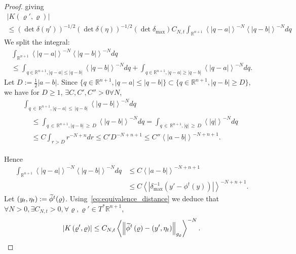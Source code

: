 \documentclass[10pt]{amsart}
\theoremstyle{definition}\newtheorem{defi}[theo]{Definition}\newtheorem{rema}[theo]{Remark}\newtheorem{exam}[theo]{Example}\newtheorem{exem}[theo]{Example}\newtheorem{nota}[theo]{Notation}
\newcommand{\bbR}{\mathbb{R}}
\let\oldtilde\tilde
\renewcommand*{\tilde}[1]{\mathchoice{\widetilde{#1}}{\widetilde{#1}}{\oldtilde{#1}}{\oldtilde{#1}}}
\let\oldexists\exists
\renewcommand*{\exists}{\mathrel{\oldexists}}
\let\oldforall\forall
\renewcommand*{\forall}{\mathrel{\oldforall}}
\begin{document}
\begin{proof}
giving
\begin{multline*}
\left|K\left(\varrho',\varrho\right)\right|\\\leq\left(\det \delta\left(\eta'\right)\right)^{-1/2}\left(\det \delta\left(\eta\right)\right)^{-1/2}\left(\det \delta_{\max}\right)C_{N,t}\int_{\bbR^{n+1}}\left\langle \left|q-a\right|\right\rangle ^{-N}\left\langle \left|q-b\right|\right\rangle ^{-N}dq
\end{multline*}
We split the integral:
\begin{multline*}
\int_{\bbR^{n+1}}\left\langle \left|q-a\right|\right\rangle ^{-N}\left\langle \left|q-b\right|\right\rangle ^{-N}dq\\
\leq\int_{q\in\bbR^{n+1},\left|q-a\right|\leq\left|q-b\right|} \left\langle \left|q-b\right|\right\rangle ^{-N}dq+\int_{q\in\bbR^{n+1},\left|q-a\right|\geq\left|q-b\right|}\left\langle \left|q-a\right|\right\rangle ^{-N}dq.
\end{multline*}
Let $D:=\frac{1}{2}|a-b|$. Since $\{ q\in\bbR^{n+1},|q-a|\leq|q-b|\} \subset\{ q\in\bbR^{n+1},|q-b|\geq D\}$, we have for $D\geq1$, $\exists C,C',C''>0\forall N$,
\begin{multline*}
\int_{q\,\in\,\bbR^{n+1},\left|q-a\right|\,\leq\,\left|q-b\right|}\left\langle \left|q-b\right|\right\rangle ^{-N}dq\\
\begin{aligned}
& \leq\int_{q\,\in\,\bbR^{n+1},\left|q-b\right|\,\geq\,D}\left\langle \left|q-b\right|\right\rangle ^{-N}dq=\int_{q\,\in\,\bbR^{n+1},\left|q\right|\,\geq\,D}\left\langle \left|q\right|\right\rangle ^{-N}dq\\
& \leq C\int_{r>D}r^{-N+n}dr\leq C'D^{-N+n+1}\leq C''\left\langle \left|a-b\right|\right\rangle ^{-N+n+1}.
\end{aligned}
\end{multline*}

Hence
\begin{align*}
\int_{\bbR^{n+1}}\left\langle \left|q-a\right|\right\rangle ^{-N}\left\langle \left|q-b\right|\right\rangle ^{-N}dq & \leq C\left\langle \left|a-b\right|\right\rangle ^{-N+n+1}\\
& \leq C\left\langle \left|\delta_{\max}^{-1}\left(y'-\phi^{t}\left(y\right)\right)\right|\right\rangle ^{-N+n+1}.
\end{align*}
Let $(y_{t},\eta_{t}):=\tilde{\phi}^{t}(\varrho)$. Using~\eqref{eq:equivalence_distance} we deduce that $\forall N>0,\exists C_{N,t}>0,\forall\varrho,\varrho'\in T^{*}\bbR^{n+1}$,
\begin{equation}\label{eq:K1}
\left|K\left(\varrho',\varrho\right)\right|\leq C_{N,t}\left\langle \left\Vert \tilde{\phi}^{t}\left(\varrho\right)-\left(y',\eta_{t}\right)\right\Vert _{g_{\varrho}}\right\rangle ^{-N}.
\end{equation}


\end{proof}
\end{document}
